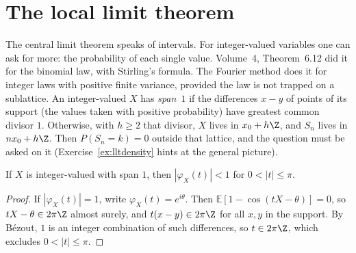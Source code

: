 \section{The local limit theorem}

The central limit theorem speaks of intervals. For integer-valued variables one can ask for more: the probability of each single value. Volume~4,
Theorem~6.12 did it for the binomial law, with Stirling's formula. The Fourier method does it for integer laws with positive finite variance,
provided the law is not trapped on a sublattice. An integer-valued $X$ has \emph{span~$1$} if the differences $x-y$ of points of its support (the
values taken with positive probability) have greatest common divisor $1$. Otherwise, with $h\ge2$ that divisor, $X$ lives in $x_0+h\Z$, and $S_n$ lives
in $nx_0+h\Z$. Then $P(S_n=k)=0$ outside that lattice, and the question must be asked on it (Exercise~\ref{ex:lltdensity} hints at the
general picture).

\begin{lemma}\label{lem:span}
If $X$ is integer-valued with span $1$, then $|\varphi_X(t)|<1$ for $0<|t|\le\pi$.
\end{lemma}
\begin{proof}
If $|\varphi_X(t)|=1$, write $\varphi_X(t)=e^{i\theta}$. Then $\mathbb E[1-\cos(tX-\theta)]=0$, so $tX-\theta\in2\pi\Z$ almost surely, and $t(x-y)\in2\pi\Z$
for all $x,y$ in the support. By B\'ezout, $1$ is an integer combination of such differences, so $t\in2\pi\Z$, which excludes $0<|t|\le\pi$.
\end{proof}

